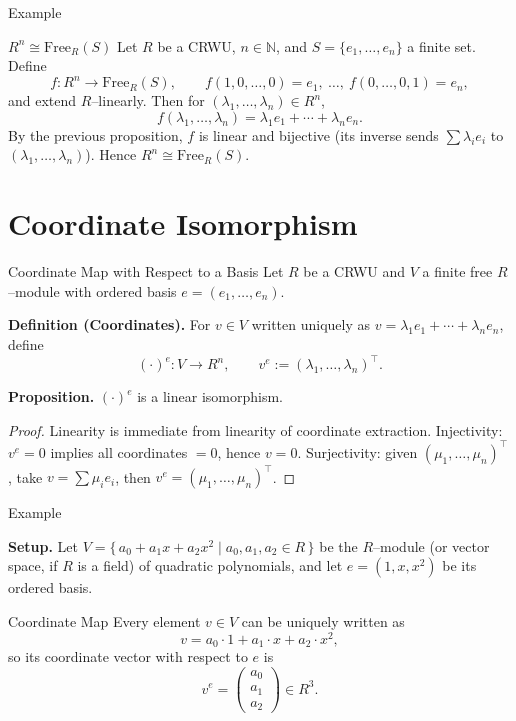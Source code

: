 \documentclass[11pt,aspectratio=43,ignorenonframetext,t]{beamer}
\begin{document}
\begin{frame}{Example}
\begin{block}{$R^n \cong \mathrm{Free}_R(S)$}
    Let $R$ be a CRWU, $n\in\mathbb{N}$, and $S=\{e_1,\dots,e_n\}$ a finite set. Define
\[
f:R^n\to \mathrm{Free}_R(S),\qquad
f(1,0,\dots,0)=e_1,\ \dots,\ f(0,\dots,0,1)=e_n,
\]
and extend $R$–linearly. Then for $(\lambda_1,\dots,\lambda_n)\in R^n$,
\[
f(\lambda_1,\dots,\lambda_n)=\lambda_1 e_1+\cdots+\lambda_n e_n.
\]
By the previous proposition, $f$ is linear and bijective (its inverse sends $\sum \lambda_i e_i$ to $(\lambda_1,\dots,\lambda_n)$). Hence $R^n\cong \mathrm{Free}_R(S)$.
\end{block}
\end{frame}

\section{Coordinate Isomorphism}

\begin{frame}{Coordinate Map with Respect to a Basis}
Let $R$ be a CRWU and $V$ a finite free $R$–module with ordered basis $e=(e_1,\dots,e_n)$.

\textbf{Definition (Coordinates).}
For $v\in V$ written uniquely as $v=\lambda_1 e_1+\cdots+\lambda_n e_n$, define
\[
(\cdot)^e: V\to R^n,\qquad v^e:=(\lambda_1,\dots,\lambda_n)^\top.
\]

\textbf{Proposition.} $(\cdot)^e$ is a linear isomorphism.

\begin{proof}
Linearity is immediate from linearity of coordinate extraction. Injectivity: $v^e=0$ implies all coordinates $=0$, hence $v=0$. Surjectivity: given $(\mu_1,\dots,\mu_n)^\top$, take $v=\sum \mu_i e_i$, then $v^e=(\mu_1,\dots,\mu_n)^\top$.
\end{proof}
\end{frame}

\begin{frame}{Example}

\textbf{Setup.}  
Let $V = \{\, a_0 + a_1x + a_2x^2 \mid a_0,a_1,a_2 \in R \,\}$ be the $R$–module (or vector space, if $R$ is a field) of quadratic polynomials,  
and let $e = (1, x, x^2)$ be its ordered basis.

\begin{block}{Coordinate Map}
Every element $v \in V$ can be uniquely written as
\[
v = a_0\cdot 1 + a_1\cdot x + a_2\cdot x^2,
\]
so its coordinate vector with respect to $e$ is
\[
v^e =
\begin{pmatrix}
a_0\\[4pt]
a_1\\[4pt]
a_2
\end{pmatrix}
\in R^3.
\]
\end{block}

\end{frame}
\end{document}
